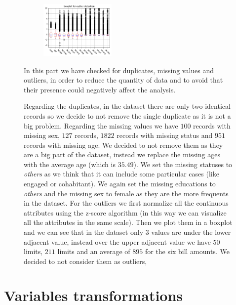 \begin{figure}[h]
  \begin{minipage}[h]{0.95\textwidth}

\begin{figure}
\centering
\includegraphics[width=0.40\textwidth]{img/ch2/outlier}
\end{figure}

    In this part we have checked for duplicates, missing values and outliers, in order to reduce the quantity of data and to avoid that their presence could negatively affect the analysis.

    Regarding the duplicates, in the dataset there are only two identical records so we decide to not remove the single duplicate as it is not a big problem.
    Regarding the missing values we have $100$ records with missing sex, $127$ records, $1822$ records with missing status and $951$ records with missing age. We decided to not remove them as they are a big part of the dataset, instead we replace the missing ages with the average age (which is $35.49$). We set the missing statuses to \textit{others} as we think that it can include some particular cases (like engaged or cohabitant). We again set the missing educations to \textit{others} and the missing sex to female as they are the more frequents in the dataset. 
    For the outliers we first normalize all the continuous attributes using the z-score algorithm (in this way we can visualize all the attributes in the same scale). Then we plot them in a boxplot and we can see that in the dataset only $3$ values are under the lower adjacent value, instead over the upper adjacent value we have $50$ limits, $211$ limits and an average of $895$ for the six bill amounts. We decided to not consider them as outliers, 
  \end{minipage}
\end{figure}

\section{Variables transformations}

